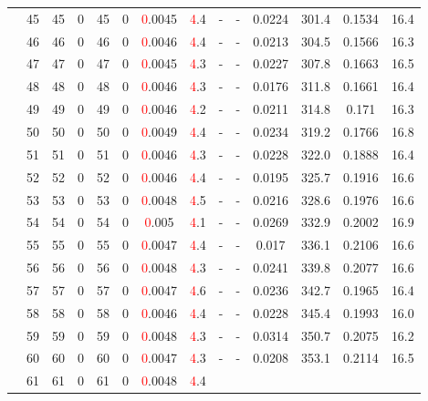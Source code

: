 \begin{table}[htb]
{\begin{tabular}{|c|c|c|c|c|c|c|c|c|c|c|c|c|c|}
 & 
45 & 45 & 0 & 45 & 0
 & \textcolor{red}0.0045 & \textcolor{red}4.4
 & - & -
 & 0.0224 & 301.4
 & 0.1534 & 16.4
 \\
 & 
46 & 46 & 0 & 46 & 0
 & \textcolor{red}0.0046 & \textcolor{red}4.4
 & - & -
 & 0.0213 & 304.5
 & 0.1566 & 16.3
 \\
 & 
47 & 47 & 0 & 47 & 0
 & \textcolor{red}0.0045 & \textcolor{red}4.3
 & - & -
 & 0.0227 & 307.8
 & 0.1663 & 16.5
 \\
 & 
48 & 48 & 0 & 48 & 0
 & \textcolor{red}0.0046 & \textcolor{red}4.3
 & - & -
 & 0.0176 & 311.8
 & 0.1661 & 16.4
 \\
 & 
49 & 49 & 0 & 49 & 0
 & \textcolor{red}0.0046 & \textcolor{red}4.2
 & - & -
 & 0.0211 & 314.8
 & 0.171 & 16.3
 \\
 & 
50 & 50 & 0 & 50 & 0
 & \textcolor{red}0.0049 & \textcolor{red}4.4
 & - & -
 & 0.0234 & 319.2
 & 0.1766 & 16.8
 \\
 & 
51 & 51 & 0 & 51 & 0
 & \textcolor{red}0.0046 & \textcolor{red}4.3
 & - & -
 & 0.0228 & 322.0
 & 0.1888 & 16.4
 \\
 & 
52 & 52 & 0 & 52 & 0
 & \textcolor{red}0.0046 & \textcolor{red}4.4
 & - & -
 & 0.0195 & 325.7
 & 0.1916 & 16.6
 \\
 & 
53 & 53 & 0 & 53 & 0
 & \textcolor{red}0.0048 & \textcolor{red}4.5
 & - & -
 & 0.0216 & 328.6
 & 0.1976 & 16.6
 \\
 & 
54 & 54 & 0 & 54 & 0
 & \textcolor{red}0.005 & \textcolor{red}4.1
 & - & -
 & 0.0269 & 332.9
 & 0.2002 & 16.9
 \\
 & 
55 & 55 & 0 & 55 & 0
 & \textcolor{red}0.0047 & \textcolor{red}4.4
 & - & -
 & 0.017 & 336.1
 & 0.2106 & 16.6
 \\
 & 
56 & 56 & 0 & 56 & 0
 & \textcolor{red}0.0048 & \textcolor{red}4.3
 & - & -
 & 0.0241 & 339.8
 & 0.2077 & 16.6
 \\
 & 
57 & 57 & 0 & 57 & 0
 & \textcolor{red}0.0047 & \textcolor{red}4.6
 & - & -
 & 0.0236 & 342.7
 & 0.1965 & 16.4
 \\
 & 
58 & 58 & 0 & 58 & 0
 & \textcolor{red}0.0046 & \textcolor{red}4.4
 & - & -
 & 0.0228 & 345.4
 & 0.1993 & 16.0
 \\
 & 
59 & 59 & 0 & 59 & 0
 & \textcolor{red}0.0048 & \textcolor{red}4.3
 & - & -
 & 0.0314 & 350.7
 & 0.2075 & 16.2
 \\
 & 
60 & 60 & 0 & 60 & 0
 & \textcolor{red}0.0047 & \textcolor{red}4.3
 & - & -
 & 0.0208 & 353.1
 & 0.2114 & 16.5
 \\
 & 
61 & 61 & 0 & 61 & 0
 & \textcolor{red}0.0048 & \textcolor{red}4.4

\end{tabular}}
\end{table}
